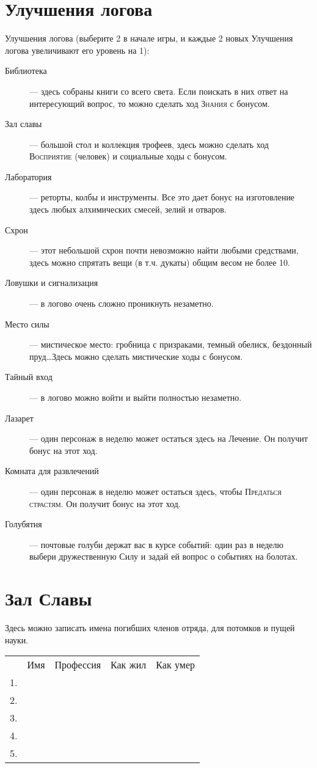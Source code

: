 \documentclass[10pt,twoside]{report}
\begin{document}

\section*{Улучшения логова}

Улучшения логова (выберите 2 в начале игры, и каждые 2 новых Улучшения
логова увеличивают его уровень на 1):
\begin{description}
  \item[Библиотека]--- здесь собраны книги со всего света. Если
    поискать в них ответ на интересующий вопрос, то можно сделать ход
    \textsc{Знания} с бонусом.
  \item[Зал славы]--- большой стол и коллекция трофеев, здесь можно
    сделать ход \textsc{Восприятие} (человек) и социальные ходы с бонусом.
  \item[Лаборатория]--- реторты, колбы и инструменты. Все это дает
    бонус на изготовление здесь любых алхимических смесей, зелий и
    отваров.
  \item[Схрон]--- этот небольшой схрон почти невозможно найти любыми
    средствами, здесь можно спрятать вещи (в т.ч. дукаты) общим весом
    не более 10.
  \item[Ловушки и сигнализация]--- в логово очень сложно проникнуть
    незаметно.
  \item[Место силы]--- мистическое место: гробница с призраками,
    темный обелиск, бездонный пруд\ldots Здесь можно сделать
    мистические ходы с бонусом.
  \item[Тайный вход]--- в логово можно войти и выйти полностью
    незаметно.
  \item[Лазарет]--- один персонаж в неделю может остаться здесь на
    Лечение. Он получит бонус на этот ход.
  \item[Комната для развлечений]--- один персонаж в неделю может
    остаться здесь, чтобы \textsc{Предаться страстям}. Он получит бонус на этот
    ход.
  \item[Голубятня]--- почтовые голуби держат вас в курсе событий: один
    раз в неделю выбери дружественную Силу и задай ей вопрос о
    событиях на болотах.
\end{description}
\vfill
\pagebreak

\section*{Зал Славы}
Здесь можно записать имена погибших членов отряда, для потомков и
пущей науки.

\begin{tabular}{p{0.5cm} l l l l}
  &Имя&Профессия&Как жил&Как умер \\
  1.&&&& \\
  2.&&&& \\
  3.&&&& \\
  4.&&&& \\
  5.&&&& \\
  
\end{tabular}
\end{document}
